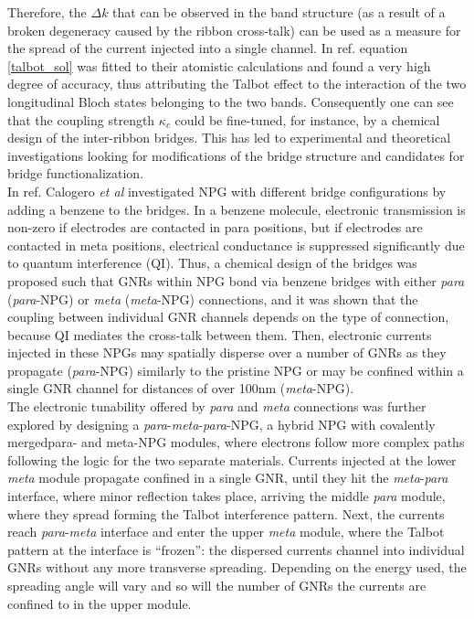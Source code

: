 Therefore, the \(\Delta k\) that can be observed in the band structure (as a result of a broken degeneracy caused by the ribbon cross-talk) can be used as a measure for the spread of the current injected into a single channel. In ref. \parencite{Calogero2019} equation \ref{talbot_sol} was fitted to their atomistic calculations and found a very high degree of accuracy, thus attributing the Talbot effect to the interaction of the two longitudinal Bloch states belonging to the two bands. Consequently one can see that the coupling
strength \(\kappa_c\) could be fine-tuned, for instance, by a chemical design of the inter-ribbon bridges\parencite{Calogero2019}. This has led to experimental and theoretical investigations looking for modifications of the bridge structure\parencite{Calogero2019a} and candidates for bridge functionalization\parencite{Alcon2021}.\\

In ref. \parencite{Calogero2019a} Calogero \textit{et al} investigated NPG with different bridge configurations by adding a benzene to the bridges. In a benzene molecule, electronic transmission is non-zero if electrodes are contacted in para positions, but if electrodes are contacted in meta positions, electrical conductance is suppressed significantly due to quantum interference (QI)\parencite{Solomon2010,Arroyo2013}. Thus, a chemical design of the bridges was proposed such that GNRs within NPG bond via benzene bridges with either \textit{para} (\textit{para}-NPG) or \textit{meta} (\textit{meta}-NPG) connections, and it was shown that the coupling between individual GNR channels depends on the type of connection, because QI mediates the cross-talk between them. Then, electronic currents injected in these NPGs may spatially disperse over a number of GNRs as they propagate (\textit{para}-NPG) similarly to the pristine NPG\parencite{Calogero2019} or may be confined within a single GNR channel for distances of over 100nm (\textit{meta}-NPG).\\

The electronic tunability offered by \textit{para} and \textit{meta} connections was further explored by designing a \textit{para}-\textit{meta}-\textit{para}-NPG, a hybrid NPG with covalently mergedpara- and meta-NPG modules, where electrons follow more complex paths following the logic for the two separate materials\parencite{Calogero2019a}. Currents injected at the lower \textit{meta} module propagate confined in a single GNR, until they hit the \textit{meta}-\textit{para} interface, where minor reflection takes place, arriving the middle \textit{para} module, where they spread forming the Talbot interference pattern. Next, the currents reach \textit{para}-\textit{meta} interface and enter the upper \textit{meta} module, where the Talbot pattern at the interface is ``frozen'': the dispersed currents channel into individual GNRs without any more transverse spreading. Depending on the energy used, the spreading angle will vary\parencite{Calogero2019} and so will the number of GNRs the currents are confined to in the upper module.\\

